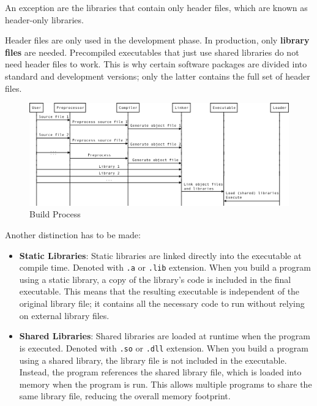 \begin{observationblock}
An exception are the libraries that contain only header files, which are known as header-only libraries.
\end{observationblock}

Header files are only used in the development phase. In production, only \textbf{library files} are
needed. Precompiled executables that just use shared libraries do not need header files to work. This is
why certain software packages are divided into standard and development versions; only the latter
contains the full set of header files.

\begin{figure}[H]
    \centering
    \includegraphics[width=\textwidth]{assets/build_process.png}
    \caption{Build Process}
\end{figure}

Another distinction has to be made:
\begin{itemize}
    \item \textbf{Static Libraries}: Static libraries are linked directly into the executable at compile time. Denoted with \texttt{.a} or \texttt{.lib} extension. When you build a program using a static library, a copy of the library's code is
    included in the final executable. This means that the resulting executable is independent of
    the original library file; it contains all the necessary code to run without relying on external
    library files.
    \item \textbf{Shared Libraries}: Shared libraries are loaded at runtime when the program is executed. Denoted with \texttt{.so} or \texttt{.dll} extension. When you build a program using a shared library, the library file is not included in the
    executable. Instead, the program references the shared library file, which is loaded into memory
    when the program is run. This allows multiple programs to share the same library file, reducing
    the overall memory footprint.
\end{itemize}

